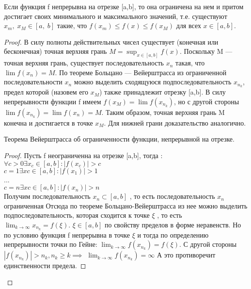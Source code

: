 
\begin{ther}
Если функция f непрерывна на отрезке [a,b],
то она ограничена на нем и притом достигает своих минимального и максимального значений,
т.е. существуют $ x_m,\;x_M\in[a,\;b]$ такие,
что $f(x_{m})\leq f(x)\leq f(x_{M})$
для всех $x\in [a,b]$.
\begin{proof}
В силу полноты действительных чисел существует (конечная или бесконечная) точная
верхняя грань $M=\sup _{{x\in [a,b]}}f(x)$.
Поскольку M — точная верхняя грань, существует последовательность
$x_{n}$ такая, что $\lim f(x_{n})=M$.
По теореме Больцано — Вейерштрасса из ограниченной последовательности
$x_{n}$ можно выделить сходящуюся подпоследовательность $x_{{n_{k}}}$,
предел которой (назовем его $x_M$) также принадлежит отрезку
[a,b]. В силу непрерывности функции f имеем
$f(x_{M})=\lim f(x_{{n_{k}}})$, но с другой стороны $\lim f(x_{{n_{k}}})=\lim f(x_{n})=M$.
Таким образом, точная верхняя грань  M конечна и достигается в точке $x_M$.
Для нижней грани доказательство аналогично.
\begin{ther}
Теорема Вейерштрасса об ограниченности функции, непрерывной на отрезке.
\end{ther}
\begin{proof}
	Пусть f неограниченна на отрезке [a,b], тогда :
	$\forall c>0 \exists x_{c} \in [a,b]:|f(x_{c})|>c$\\
	$c=1 \exists xc \in [a,b]:|f(x_{1})|>1$\\
	...\\
	$c=n \exists xc \in [a,b]:|f(x_{n})|>n$\\
	Получим последовательность $x_{n} \subset [a,b]$ ,
	то есть последовательность $x_{n}$ ограниченная
Отсюда по теореме Больцано-Вейерштрасса из нее можно выделить подпоследовательность,
 которая сходится к точке $\xi$ , то есть $\lim_{k\to \infty}{x_{n_{k}}} = f(\xi)$.
 $\xi \in [a,b]$ по свойству пределов в форме неравенств. Но по условию функция f
 непрерывна в точке $\xi$ и тогда по определению непрерывности точки по Гейне:
 $\lim_{k\to \infty}{f(x_{n_{k}})} = f(\xi)$. С другой стороны $|f(x_{n_{k}})|
 > n_{k}, n_{k} \geq k \implies$ $\lim_{k\to \infty}{f(x_{n_{k}})} = \infty$
 А это противоречит единственности предела.
\end{proof}
\end{proof}
\end{ther}
